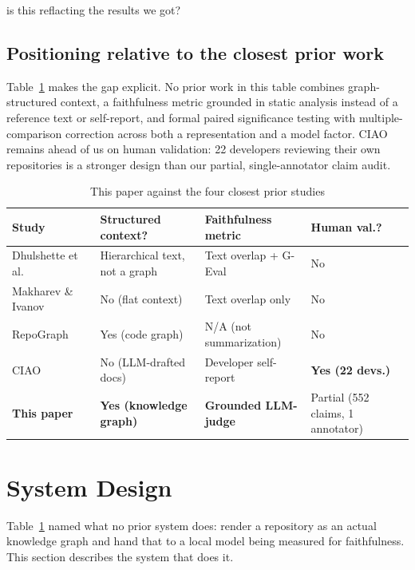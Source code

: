 is this reflacting the results we got?\documentclass[conference]{IEEEtran}
\begin{document}
\subsection{Positioning relative to the closest prior work}
Table~\ref{tab:related} makes the gap explicit. No prior work in this table combines
graph-structured context, a faithfulness metric grounded in static analysis instead of a
reference text or self-report, and formal paired significance testing with
multiple-comparison correction across both a representation and a model factor. CIAO remains
ahead of us on human validation: 22 developers reviewing their own repositories is a stronger
design than our partial, single-annotator claim audit.

\begin{table}[htbp]
\caption{This paper against the four closest prior studies}
\label{tab:related}
\centering
\footnotesize
\begin{tabular}{@{}p{1.5cm}p{1.4cm}p{1.5cm}p{1.5cm}@{}}
\toprule
Study & Structured context? & Faithfulness metric & Human val.? \\
\midrule
Dhulshette et al.~\cite{dhulshette2025hierarchical} & Hierarchical text, not a graph & Text overlap + G-Eval & No \\
Makharev \& Ivanov~\cite{makharev2025beyond} & No (flat context) & Text overlap only & No \\
RepoGraph~\cite{ouyang2024repograph} & Yes (code graph) & N/A (not summarization) & No \\
CIAO~\cite{deluca2026ciao} & No (LLM-drafted docs) & Developer self-report & \textbf{Yes (22 devs.)} \\
\textbf{This paper} & \textbf{Yes (knowledge graph)} & \textbf{Grounded LLM-judge} & Partial (552 claims, 1 annotator) \\
\bottomrule
\end{tabular}
\end{table}

\section{System Design}
\label{sec:system}

Table~\ref{tab:related} named what no prior system does: render a repository as an actual
knowledge graph and hand that to a local model being measured for faithfulness. This section
describes the system that does it.
\end{document}
